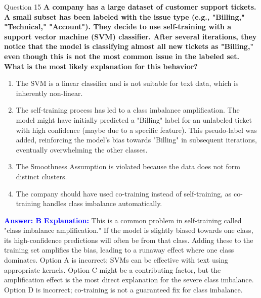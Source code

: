 \documentclass[8pt]{beamer}  %
\begin{document}
	\begin{frame}{Question 15}
		\textbf{A company has a large dataset of customer support tickets. A small subset has been labeled with the issue type (e.g., "Billing," "Technical," "Account"). They decide to use self-training with a support vector machine (SVM) classifier. After several iterations, they notice that the model is classifying almost all new tickets as "Billing," even though this is not the most common issue in the labeled set. What is the most likely explanation for this behavior?}
		\begin{enumerate}
			\item The SVM is a linear classifier and is not suitable for text data, which is inherently non-linear.
			\item The self-training process has led to a class imbalance amplification. The model might have initially predicted a "Billing" label for an unlabeled ticket with high confidence (maybe due to a specific feature). This pseudo-label was added, reinforcing the model's bias towards "Billing" in subsequent iterations, eventually overwhelming the other classes.
			\item The Smoothness Assumption is violated because the data does not form distinct clusters.
			\item The company should have used co-training instead of self-training, as co-training handles class imbalance automatically.
		\end{enumerate}
		\vspace{0.2cm}
		\textcolor{blue}{\textbf{Answer: B}}
		\vspace{0.2cm}
		\textcolor{blue}{\textbf{Explanation:}} This is a common problem in self-training called "class imbalance amplification." If the model is slightly biased towards one class, its high-confidence predictions will often be from that class. Adding these to the training set amplifies the bias, leading to a runaway effect where one class dominates. Option A is incorrect; SVMs can be effective with text using appropriate kernels. Option C might be a contributing factor, but the amplification effect is the most direct explanation for the severe class imbalance. Option D is incorrect; co-training is not a guaranteed fix for class imbalance.
	\end{frame}
	
\end{document}
